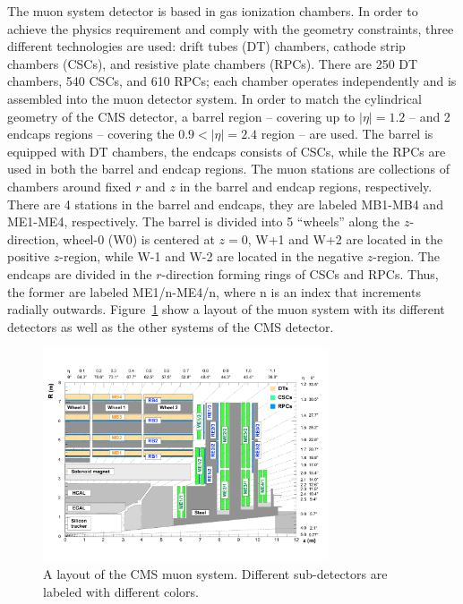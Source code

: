 The muon system detector is based in gas ionization chambers. In order
to achieve the physics requirement and comply with the geometry
constraints, three different technologies are used: drift tubes
(DT) chambers, cathode strip chambers (CSCs), and resistive plate chambers
(RPCs). There are 250 DT chambers, 540 CSCs, and 610 RPCs; each
chamber operates independently and is assembled into the muon detector
system. In order to match the cylindrical geometry of the CMS
detector, a barrel region -- covering up to $|\eta| = 1.2$ -- and 2
endcaps regions  -- covering the $ 0.9 < |\eta| = 2.4$ region --  are used. The barrel
is equipped with DT chambers, the endcaps consists of CSCs, while the
RPCs are used in both the barrel and endcap regions. The muon stations
are collections of chambers around fixed $r$ and $z$ in the barrel and
endcap regions, respectively. There are 4 stations in the barrel and
endcaps, they are labeled MB1-MB4 and ME1-ME4, respectively. The
barrel is divided into 5 ``wheels'' along the $z$-direction, wheel-0
(W0) is centered at $z=0$, W+1 and W+2 are located in the positive
$z$-region, while W-1 and W-2 are located in the negative
$z$-region. The endcaps are divided in the $r$-direction forming rings
of CSCs and RPCs. Thus, the former are labeled ME1/n-ME4/n, where n is
an index that increments radially
outwards. Figure~\ref{fig:MuonSystemLayout} show a layout of the
muon system with its different detectors as well as the other systems
of the CMS detector. 
\begin{figure}
 \centering
\includegraphics[width=0.75\textwidth]{CMS_DetectorFigures/MuonSystemLayout.pdf}
\caption{A layout of the CMS muon system. Different sub-detectors are
  labeled with different colors.\label{fig:MuonSystemLayout}}
\end{figure}


